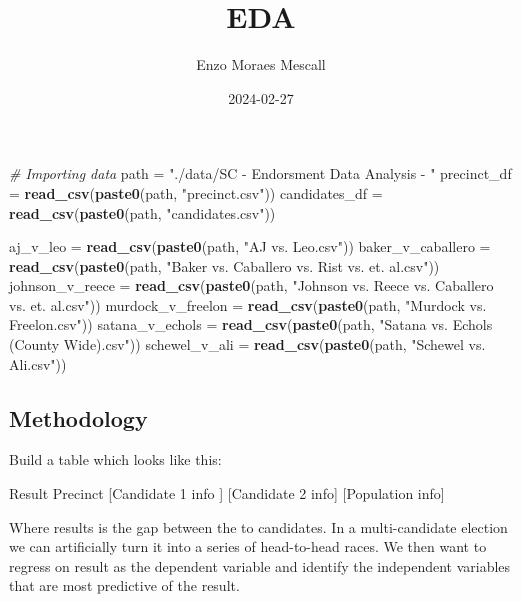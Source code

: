 \documentclass[
]{article}
\title{EDA}
\author{Enzo Moraes Mescall}
\date{2024-02-27}
\newenvironment{Shaded}{\begin{snugshade}}{\end{snugshade}}
\newcommand{\CommentTok}[1]{\textcolor[rgb]{0.56,0.35,0.01}{\textit{#1}}}
\newcommand{\FunctionTok}[1]{\textcolor[rgb]{0.13,0.29,0.53}{\textbf{#1}}}
\newcommand{\NormalTok}[1]{#1}
\newcommand{\OtherTok}[1]{\textcolor[rgb]{0.56,0.35,0.01}{#1}}
\newcommand{\StringTok}[1]{\textcolor[rgb]{0.31,0.60,0.02}{#1}}
\begin{document}
\maketitle

\begin{Shaded}
\begin{Highlighting}[]
\CommentTok{\# Importing data}
\NormalTok{path }\OtherTok{=} \StringTok{"./data/SC {-} Endorsment Data Analysis {-} "}
\NormalTok{precinct\_df }\OtherTok{=} \FunctionTok{read\_csv}\NormalTok{(}\FunctionTok{paste0}\NormalTok{(path, }\StringTok{"precinct.csv"}\NormalTok{))}
\NormalTok{candidates\_df }\OtherTok{=} \FunctionTok{read\_csv}\NormalTok{(}\FunctionTok{paste0}\NormalTok{(path, }\StringTok{"candidates.csv"}\NormalTok{))}

\NormalTok{aj\_v\_leo }\OtherTok{=} \FunctionTok{read\_csv}\NormalTok{(}\FunctionTok{paste0}\NormalTok{(path, }\StringTok{"AJ vs. Leo.csv"}\NormalTok{))}
\NormalTok{baker\_v\_caballero }\OtherTok{=} \FunctionTok{read\_csv}\NormalTok{(}\FunctionTok{paste0}\NormalTok{(path, }\StringTok{"Baker vs. Caballero vs. Rist vs. et. al.csv"}\NormalTok{))}
\NormalTok{johnson\_v\_reece }\OtherTok{=} \FunctionTok{read\_csv}\NormalTok{(}\FunctionTok{paste0}\NormalTok{(path, }\StringTok{"Johnson vs. Reece vs. Caballero vs. et. al.csv"}\NormalTok{))}
\NormalTok{murdock\_v\_freelon }\OtherTok{=} \FunctionTok{read\_csv}\NormalTok{(}\FunctionTok{paste0}\NormalTok{(path, }\StringTok{"Murdock vs. Freelon.csv"}\NormalTok{))}
\NormalTok{satana\_v\_echols }\OtherTok{=} \FunctionTok{read\_csv}\NormalTok{(}\FunctionTok{paste0}\NormalTok{(path, }\StringTok{"Satana vs. Echols (County Wide).csv"}\NormalTok{))}
\NormalTok{schewel\_v\_ali }\OtherTok{=} \FunctionTok{read\_csv}\NormalTok{(}\FunctionTok{paste0}\NormalTok{(path, }\StringTok{"Schewel vs. Ali.csv"}\NormalTok{))}
\end{Highlighting}
\end{Shaded}

\hypertarget{methodology}{%
\subsection{Methodology}\label{methodology}}

Build a table which looks like this:

Result \textbar{} Precinct \textbar{} {[}Candidate 1 info {]} \textbar{}
{[}Candidate 2 info{]} \textbar{} {[}Population info{]}

Where results is the gap between the to candidates. In a multi-candidate
election we can artificially turn it into a series of head-to-head
races. We then want to regress on result as the dependent variable and
identify the independent variables that are most predictive of the
result.
\end{document}
